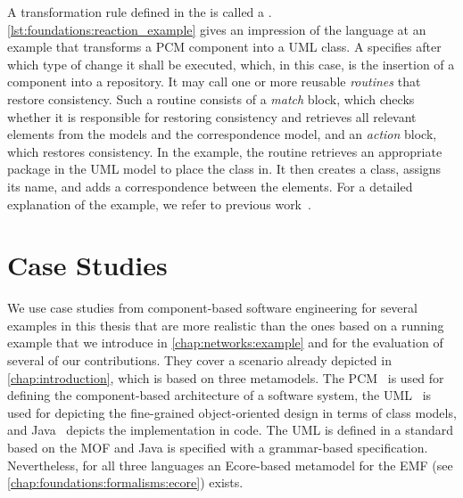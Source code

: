 A transformation rule defined in the \reactionslanguage is called a \emph{\reaction}.
\autoref{lst:foundations:reaction_example} gives an impression of the language at an example that transforms a \gls{PCM} component into a \gls{UML} class.
A \reaction specifies after which type of change it shall be executed, which, in this case, is the insertion of a component into a repository.
It may call one or more reusable \emph{routines} that restore consistency.
Such a routine consists of a \emph{match} block, which checks whether it is responsible for restoring consistency and retrieves all relevant elements from the models and the correspondence model, and an \emph{action} block, which restores consistency.
In the example, the routine retrieves an appropriate package in the \gls{UML} model to place the class in.
It then creates a class, assigns its name, and adds a correspondence between the elements.
For a detailed explanation of the example, we refer to previous work~.


\section{Case Studies}
\label{chap:foundations:case_studies}

We use case studies from component-based software engineering for several examples in this thesis that are more realistic than the ones based on a running example that we introduce in \autoref{chap:networks:example} and for the evaluation of several of our contributions.
They cover a scenario already depicted in \autoref{chap:introduction}, which is based on three metamodels.
The \gls{PCM}~\cite{reussner2016a} is used for defining the component-based architecture of a software system, the \gls{UML}~\cite{uml} is used for depicting the fine-grained object-oriented design in terms of class models, and Java~\cite{gosling2018jls-specification} depicts the implementation in code.
The \gls{UML} is defined in a standard based on the \gls{MOF} and Java is specified with a grammar-based specification.
Nevertheless, for all three languages an Ecore-based metamodel for the \gls{EMF} (see \autoref{chap:foundations:formalisms:ecore}) exists.

